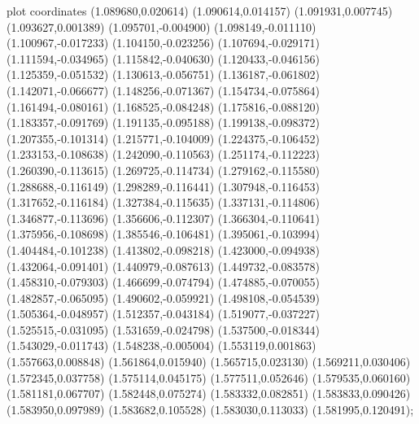 { plot coordinates {(1.089680,0.020614) (1.090614,0.014157) (1.091931,0.007745) (1.093627,0.001389) (1.095701,-0.004900) (1.098149,-0.011110) (1.100967,-0.017233) (1.104150,-0.023256) (1.107694,-0.029171) (1.111594,-0.034965) (1.115842,-0.040630) (1.120433,-0.046156) (1.125359,-0.051532) (1.130613,-0.056751) (1.136187,-0.061802) (1.142071,-0.066677) (1.148256,-0.071367) (1.154734,-0.075864) (1.161494,-0.080161) (1.168525,-0.084248) (1.175816,-0.088120) (1.183357,-0.091769) (1.191135,-0.095188) (1.199138,-0.098372) (1.207355,-0.101314) (1.215771,-0.104009) (1.224375,-0.106452) (1.233153,-0.108638) (1.242090,-0.110563) (1.251174,-0.112223) (1.260390,-0.113615) (1.269725,-0.114734) (1.279162,-0.115580) (1.288688,-0.116149) (1.298289,-0.116441) (1.307948,-0.116453) (1.317652,-0.116184) (1.327384,-0.115635) (1.337131,-0.114806) (1.346877,-0.113696) (1.356606,-0.112307) (1.366304,-0.110641) (1.375956,-0.108698) (1.385546,-0.106481) (1.395061,-0.103994) (1.404484,-0.101238) (1.413802,-0.098218) (1.423000,-0.094938) (1.432064,-0.091401) (1.440979,-0.087613) (1.449732,-0.083578) (1.458310,-0.079303) (1.466699,-0.074794) (1.474885,-0.070055) (1.482857,-0.065095) (1.490602,-0.059921) (1.498108,-0.054539) (1.505364,-0.048957) (1.512357,-0.043184) (1.519077,-0.037227) (1.525515,-0.031095) (1.531659,-0.024798) (1.537500,-0.018344) (1.543029,-0.011743) (1.548238,-0.005004) (1.553119,0.001863) (1.557663,0.008848) (1.561864,0.015940) (1.565715,0.023130) (1.569211,0.030406) (1.572345,0.037758) (1.575114,0.045175) (1.577511,0.052646) (1.579535,0.060160) (1.581181,0.067707) (1.582448,0.075274) (1.583332,0.082851) (1.583833,0.090426) (1.583950,0.097989) (1.583682,0.105528) (1.583030,0.113033) (1.581995,0.120491)};
}
